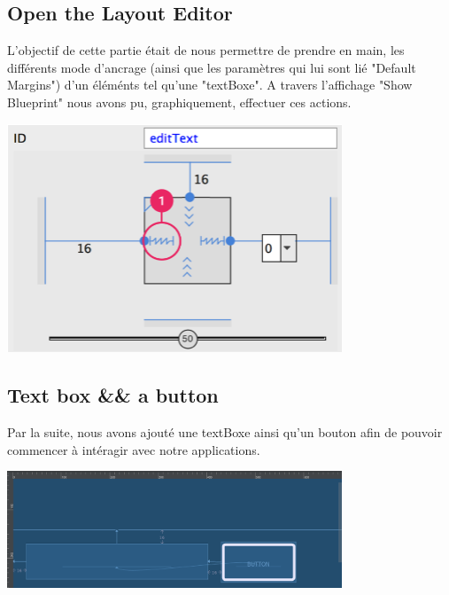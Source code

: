 \documentclass[french,a4paper,12pt]{report}
\begin{document}
\subsection{Open the Layout Editor}
L'objectif de cette partie était de nous permettre de prendre en main, les
différents mode d'ancrage (ainsi que les paramètres qui lui sont lié "Default
Margins") d'un éléménts tel qu'une "textBoxe". A travers l'affichage "Show
Blueprint" nous avons pu, graphiquement, effectuer ces actions.

\includegraphics[width=10cm]{131.png}

\subsection{Text box && a button}
Par la suite, nous avons ajouté une textBoxe ainsi qu'un bouton afin de pouvoir
commencer à intéragir avec notre applications.

\includegraphics[width=10cm]{15.png}
\end{document}
